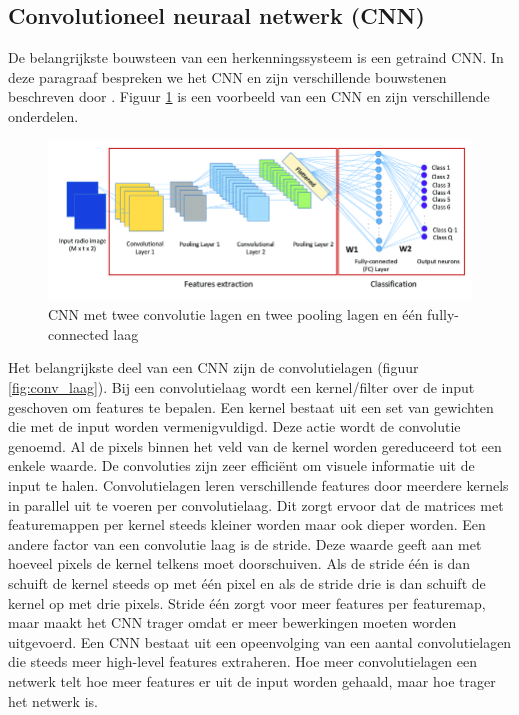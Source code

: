 \subsection{Convolutioneel neuraal netwerk (CNN) }
De belangrijkste bouwsteen van een herkenningssysteem is een getraind CNN.
In deze paragraaf bespreken we het CNN en zijn verschillende bouwstenen beschreven door \cite{jiang_deep_2019}.
Figuur \ref{fig:cnn} is een voorbeeld van een CNN en zijn verschillende onderdelen.

\begin{figure}[!ht]
    \centering
 	\includegraphics[width=0.85\linewidth]{fig/cnn_2.png}
 	\caption{CNN met twee convolutie lagen en twee pooling lagen en \'e\'en fully-connected laag}
 	\label{fig:cnn}
\end{figure}
 
Het belangrijkste deel van een CNN zijn de convolutielagen (figuur \ref{fig:conv_laag}). 
Bij een convolutielaag wordt een kernel/filter over de input geschoven om features te bepalen. 
Een kernel bestaat uit een set van gewichten die met de input worden vermenigvuldigd.
Deze actie wordt de convolutie genoemd.
Al de pixels binnen het veld van de kernel worden gereduceerd tot een enkele waarde. 
De convoluties zijn zeer effici\"ent om visuele informatie uit de input te halen.
Convolutielagen leren verschillende features door meerdere kernels in parallel uit te voeren per convolutielaag. 
Dit zorgt ervoor dat de matrices met featuremappen per kernel steeds kleiner worden maar ook dieper worden. 
Een andere factor van een convolutie laag is de stride.
Deze waarde geeft aan met hoeveel pixels de kernel telkens moet doorschuiven. 
Als de stride \'e\'en is dan schuift de kernel steeds op met \'e\'en pixel en als de stride drie is dan schuift de kernel op met drie pixels.
Stride \'e\'en zorgt voor meer features per featuremap, maar maakt het CNN trager omdat er meer bewerkingen moeten worden uitgevoerd.
Een CNN bestaat uit een opeenvolging van een aantal convolutielagen die steeds meer high-level features extraheren. 
Hoe meer convolutielagen een netwerk telt hoe meer features er uit de input worden gehaald, maar hoe trager het netwerk is. 

